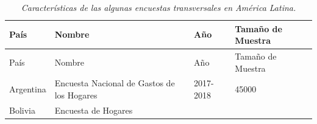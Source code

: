 \documentclass[12pt,spanish,]{book}
\begin{document}
\begin{longtable}[]{@{}llll@{}}
\caption{\emph{Características de las algunas encuestas transversales en América Latina.}}\tabularnewline
\toprule
\begin{minipage}[b]{0.17\columnwidth}\raggedright
País\strut
\end{minipage} & \begin{minipage}[b]{0.50\columnwidth}\raggedright
Nombre\strut
\end{minipage} & \begin{minipage}[b]{0.08\columnwidth}\raggedright
Año\strut
\end{minipage} & \begin{minipage}[b]{0.14\columnwidth}\raggedright
Tamaño de Muestra\strut
\end{minipage}\tabularnewline
\midrule
\endfirsthead
\toprule
\begin{minipage}[b]{0.17\columnwidth}\raggedright
País\strut
\end{minipage} & \begin{minipage}[b]{0.50\columnwidth}\raggedright
Nombre\strut
\end{minipage} & \begin{minipage}[b]{0.08\columnwidth}\raggedright
Año\strut
\end{minipage} & \begin{minipage}[b]{0.14\columnwidth}\raggedright
Tamaño de Muestra\strut
\end{minipage}\tabularnewline
\midrule
\endhead
\begin{minipage}[t]{0.17\columnwidth}\raggedright
Argentina\strut
\end{minipage} & \begin{minipage}[t]{0.50\columnwidth}\raggedright
Encuesta Nacional de Gastos de los Hogares\strut
\end{minipage} & \begin{minipage}[t]{0.08\columnwidth}\raggedright
2017-2018\strut
\end{minipage} & \begin{minipage}[t]{0.14\columnwidth}\raggedright
45000\strut
\end{minipage}\tabularnewline
\begin{minipage}[t]{0.17\columnwidth}\raggedright
Bolivia\strut
\end{minipage} & \begin{minipage}[t]{0.50\columnwidth}\raggedright
Encuesta de Hogares\strut
\end{minipage} & \begin{minipage}[t]{0.08\columnwidth}\raggedright

\end{minipage}
\end{longtable}
\end{document}
